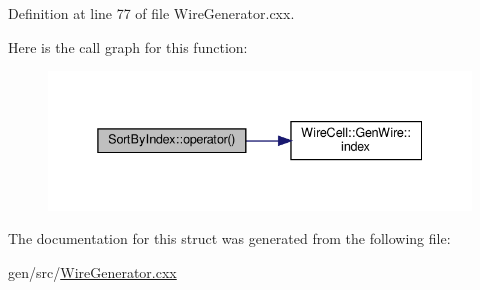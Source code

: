 Definition at line 77 of file Wire\+Generator.\+cxx.

Here is the call graph for this function\+:
\nopagebreak
\begin{figure}[H]
\begin{center}
\leavevmode
\includegraphics[width=338pt]{struct_sort_by_index_ad0c929afcad7ad7b625ee89add8f09d0_cgraph}
\end{center}
\end{figure}


The documentation for this struct was generated from the following file\+:\begin{DoxyCompactItemize}
\item 
gen/src/\hyperlink{_wire_generator_8cxx}{Wire\+Generator.\+cxx}\end{DoxyCompactItemize}
